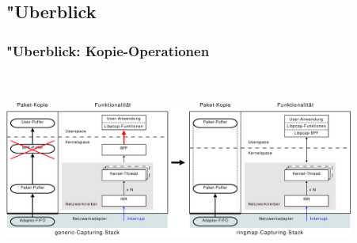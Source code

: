 \documentclass{beamer}
\begin{document}
\begin{frame}
\begin{columns}
\end{columns}
\end{frame}

\subsection*{"Uberblick}
\begin{frame}
\frametitle{"Uberblick: Kopie-Operationen}
\begin{center}
\includegraphics [height=65mm,width=115mm]{pics/Ueberblick_new}
\end{center}
\end{frame}
\end{document}
